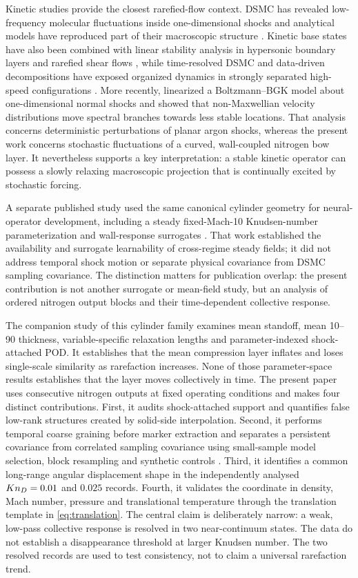 Kinetic studies provide the closest rarefied-flow context. DSMC has revealed low-frequency molecular fluctuations inside one-dimensional shocks and analytical models have reproduced part of their macroscopic structure \citep{Sawant2021,Sawant2022}. Kinetic base states have also been combined with linear stability analysis in hypersonic boundary layers and rarefied shear flows \citep{Klothakis2022,Zou2023}, while time-resolved DSMC and data-driven decompositions have exposed organized dynamics in strongly separated high-speed configurations \citep{Karpuzcu2025}. More recently, \citet{Karpuzcu2026} linearized a Boltzmann--BGK model about one-dimensional normal shocks and showed that non-Maxwellian velocity distributions move spectral branches towards less stable locations. That analysis concerns deterministic perturbations of planar argon shocks, whereas the present work concerns stochastic fluctuations of a curved, wall-coupled nitrogen bow layer. It nevertheless supports a key interpretation: a stable kinetic operator can possess a slowly relaxing macroscopic projection that is continually excited by stochastic forcing.

A separate published study used the same canonical cylinder geometry for neural-operator development, including a steady fixed-Mach-10 Knudsen-number parameterization and wall-response surrogates \citep{RoohiShojaAzghadi2026PoF}. That work established the availability and surrogate learnability of cross-regime steady fields; it did not address temporal shock motion or separate physical covariance from DSMC sampling covariance. The distinction matters for publication overlap: the present contribution is not another surrogate or mean-field study, but an analysis of ordered nitrogen output blocks and their time-dependent collective response.

The companion study of this cylinder family \citep{RoohiShoja2026Mean} examines mean standoff, mean 10--90 thickness, variable-specific relaxation lengths and parameter-indexed shock-attached POD. It establishes that the mean compression layer inflates and loses single-scale similarity as rarefaction increases. None of those parameter-space results establishes that the layer moves collectively in time. The present paper uses consecutive nitrogen outputs at fixed operating conditions and makes four distinct contributions. First, it audits shock-attached support and quantifies false low-rank structures created by solid-side interpolation. Second, it performs temporal coarse graining before marker extraction and separates a persistent covariance from correlated sampling covariance using small-sample model selection, block resampling and synthetic controls \citep{Akaike1974,HurvichTsai1989,Kunsch1989,PolitisRomano1994,Higham2002}. Third, it identifies a common long-range angular displacement shape in the independently analysed $Kn_D=0.01$ and $0.025$ records. Fourth, it validates the coordinate in density, Mach number, pressure and translational temperature through the translation template in \cref{eq:translation}. The central claim is deliberately narrow: a weak, low-pass collective response is resolved in two near-continuum states. The data do not establish a disappearance threshold at larger Knudsen number. The two resolved records are used to test consistency, not to claim a universal rarefaction trend.
